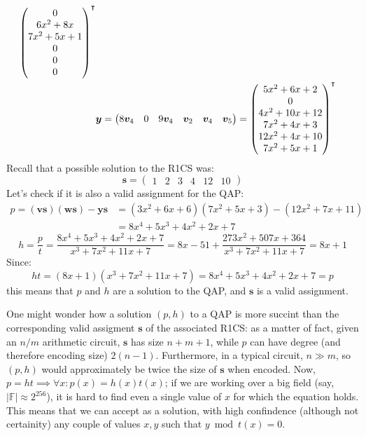 \begin{example}
\begin{align*}
{\begin{pmatrix}
			   0             \\
			   6x^2 + 8x     \\
			   7x^2 + 5x + 1 \\
			   0             \\
			   0             \\
			   0
		   \end{pmatrix}}^\transpose                                                  \\
		 & \bm{y} =
		\begin{pmatrix}
			8\bm{v}_4 & 0 & 9\bm{v}_4 & \bm{v}_2 & \bm{v}_4 & \bm{v}_5
		\end{pmatrix}
		=
		{\begin{pmatrix}
			 5x^2 + 6x + 2   \\
			 0               \\
			 4x^2 + 10x + 12 \\
			 7x^2 + 4x + 3   \\
			 12x^2 + 4x + 10 \\
			 7x^2 + 5x + 1
		 \end{pmatrix}}^\transpose
	\end{align*}
	Recall that a possible solution to the R1CS was:
	\[\bm{s} = \begin{pmatrix} 1 & 2 & 3 & 4 & 12 & 10 \end{pmatrix}\]
	Let's check if it is also a valid assignment for the QAP\@:
	\begin{align*}
		p	    = \left(\bm{v}\bm{s}\right)\left(\bm{w}\bm{s}\right) - \bm{y}\bm{s}
		 & = \left(3x^2 + 6x + 6\right)\left(7x^2 + 5x + 3\right) - \left(12x^2 + 7x + 11\right) \\
		 & = 8x^4 + 5x^3 + 4x^2 + 2x + 7
	\end{align*}
	\[
		h = \frac{p}{t} = \frac{8x^4 + 5x^3 + 4x^2 + 2x + 7}{x^3 + 7x^2 + 11x + 7} =
		8x - 51 + \frac{273x^2 + 507x + 364}{x^3 + 7x^2 + 11x + 7} = 8x + 1
	\]
	Since:
	\[ht = \left(8x + 1\right)\left(x^3 + 7x^2 + 11x + 7\right) = 8x^4 + 5x^3 + 4x^2 + 2x + 7 = p\]
	this means that \(p\) and \(h\) are a solution to the QAP, and \(\bm{s}\) is a valid
	assignment.
\end{example}

\noindent One might wonder how a solution \(\left(p, h\right)\) to a QAP is more succint than the
corresponding valid assigment \(\bm{s}\) of the associated R1CS\@: as a matter of fact, given an
\(n/m\) arithmetic circuit, \(\bm{s}\) has size \(n+m+1\), while \(p\) can have degree
(and therefore encoding size) \(2\left(n-1\right)\).
Furthermore, in a typical circuit, \(n \gg m\), so \(\left(p, h\right)\) would approximately be 
twice the size of \(\bm{s}\) when encoded.
Now, \(p = ht \implies \forall x\colon p\left(x\right) = h\left(x\right)t\left(x\right)\); 
if we are working over a big field (say, \(\left|\mathbb{F}\right| \approx 2^{256}\)), it is hard 
to find even a single value of \(x\) for which the equation holds.
This means that we can accept as a solution, with high confindence (although not certainity)
any couple of values \(x, y\) such that \(y \bmod t\left(x\right) = 0\).

